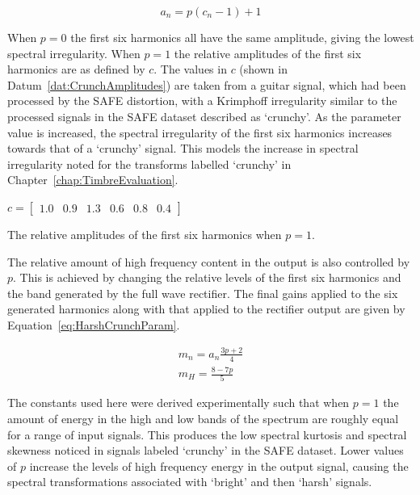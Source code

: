 			\begin{equation}
				a_{n} = p(c_{n} - 1) + 1
				\label{eq:HarshCrunchAmps}
			\end{equation}

			When $p = 0$ the first six harmonics all have the same amplitude, giving the lowest spectral
			irregularity. When $p = 1$ the relative amplitudes of the first six harmonics are as defined by
			$c$.  The values in $c$ (shown in Datum~\ref{dat:CrunchAmplitudes}) are taken from a guitar signal,
			which had been processed by the SAFE distortion, with a Krimphoff irregularity similar to the
			processed signals in the SAFE dataset described as `crunchy'. As the parameter value is increased,
			the spectral irregularity of the first six harmonics increases towards that of a `crunchy' signal.
			This models the increase in spectral irregularity noted for the transforms labelled `crunchy' in
			Chapter~\ref{chap:TimbreEvaluation}.

			\begin{datum}[h!]
				\centering
				$c = \begin{bmatrix}
					1.0 & 0.9 & 1.3 & 0.6 & 0.8 & 0.4
				     \end{bmatrix}$
				\caption{The relative amplitudes of the first six harmonics when $p = 1$.}
				\label{dat:CrunchAmplitudes}
			\end{datum}
			
			The relative amount of high frequency content in the output is also controlled by $p$. This is
			achieved by changing the relative levels of the first six harmonics and the band generated by the
			full wave rectifier. The final gains applied to the six generated harmonics along with that applied
			to the rectifier output are given by Equation~\ref{eq:HarshCrunchParam}.

			\begin{gather}
				m_{n} = a_{n}\frac{3p + 2}{4} \nonumber \\
				m_{H} = \frac{8 - 7p}{5}
				\label{eq:HarshCrunchParam}
			\end{gather}

			The constants used here were derived experimentally such that when $p = 1$ the amount of energy in
			the high and low bands of the spectrum are roughly equal for a range of input signals. This
			produces the low spectral kurtosis and spectral skewness noticed in signals labeled `crunchy' in
			the SAFE dataset. Lower values of $p$ increase the levels of high frequency energy in the output
			signal, causing the spectral transformations associated with `bright' and then `harsh' signals.

